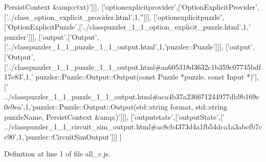 \begin{DoxyCode}
{       PersistContext &amp;ctxt)'}]]],
  [\textcolor{stringliteral}{'optionexplicitprovider'},[\textcolor{stringliteral}{'OptionExplicitProvider'},[\textcolor{stringliteral}{'../class\_option\_explicit\_provider.html'},1,\textcolor{stringliteral}{''}]]],
  [\textcolor{stringliteral}{'optionexplicitpuzzle'},[\textcolor{stringliteral}{'OptionExplicitPuzzle'},[\textcolor{stringliteral}{'../classpuzzler\_1\_1\_option\_explicit\_puzzle.html'},1,\textcolor{stringliteral}{'
      puzzler'}]]],
  [\textcolor{stringliteral}{'output'},[\textcolor{stringliteral}{'Output'},[\textcolor{stringliteral}{'../classpuzzler\_1\_1\_puzzle\_1\_1\_output.html'},1,\textcolor{stringliteral}{'puzzler::Puzzle'}]]],
  [\textcolor{stringliteral}{'output'},[\textcolor{stringliteral}{'Output'},[\textcolor{stringliteral}{'../classpuzzler\_1\_1\_puzzle\_1\_1\_output.html#aa605318d3632c1b359c07745bdf17e83'},1,\textcolor{stringliteral}{'
      puzzler::Puzzle::Output::Output(const Puzzle *puzzle, const Input *)'}],[\textcolor{stringliteral}{'
      ../classpuzzler\_1\_1\_puzzle\_1\_1\_output.html#aca4b37a236671244977db9b169e0e9ea'},1,\textcolor{stringliteral}{'puzzler::Puzzle::Output::Output(std::string format, std::string
       puzzleName, PersistContext &amp;)'}]]],
  [\textcolor{stringliteral}{'outputstate'},[\textcolor{stringliteral}{'outputState'},[\textcolor{stringliteral}{'
      ../classpuzzler\_1\_1\_circuit\_sim\_output.html#ac8cb4373d4a1fb54dca1a3abcfb7cc90'},1,\textcolor{stringliteral}{'puzzler::CircuitSimOutput'}]]]
]
\end{DoxyCode}


Definition at line 1 of file all\+\_\+c.\+js.

